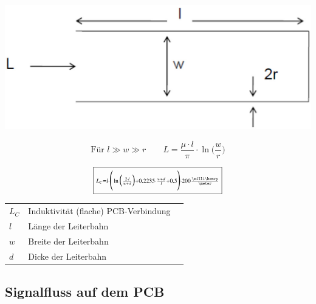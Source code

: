 \begin{minipage}[c]{0.48\columnwidth}
    \includegraphics[width=\columnwidth]{images/leitung_induktivitaet.jpg}
\end{minipage}
\hfill
\begin{minipage}[c]{0.48\columnwidth}
    $$ \boxed{ \text{Für } l \gg w \gg r \qquad L = \frac{\mu \cdot l}{\pi} \cdot \ln \Bigg( \frac{w}{r} \Bigg) } $$
\end{minipage}


\begin{minipage}[c]{0.46\columnwidth}
    $$ \boxed{ \scriptstyle{ L_C = l \cdot \Bigg( \ln \Big( \frac{2 \cdot l}{w + d} \Big) + 0.2235 \cdot \frac{w + d}{l} + 0.5 \Bigg) \cdot 200 \frac{\milli \henry}{\meter} }} $$
\end{minipage}
\hfill
\begin{minipage}[c]{0.52\columnwidth}
    \begin{tabular}{@{}llc@{}}
        $L_C$           & Induktivität (flache) PCB-Verbindung  \\
        $l$             & Länge der Leiterbahn                  \\
        $w$             & Breite der Leiterbahn                 \\
        $d$             & Dicke der Leiterbahn      
    \end{tabular}
\end{minipage}

\subsection{Signalfluss auf dem PCB}

